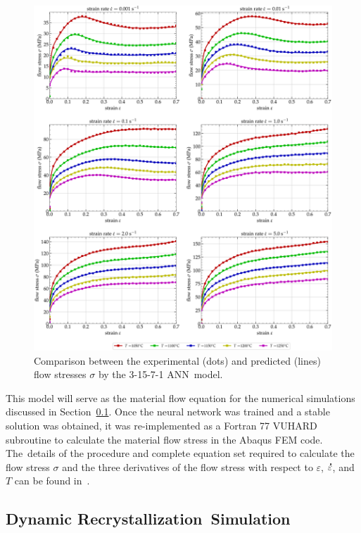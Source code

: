 \documentclass[metals,article,accept,pdftex,moreauthors]{Definitions/mdpi}
\DeclareRobustCommand{\mdot}[1]{\accentset{\mbox{\bfseries .}}{#1}}
\begin{document}
\begin{figure}[H]
\centering
\includegraphics[width=0.9\columnwidth]{Figures/CompExpANN-3-15-7-1}
\caption{Comparison %
 between the experimental (dots) and predicted (lines) flow stresses $\sigma$ by the 3-15-7-1 ANN~model.}
\label{fig:ANN-3-15-7-1}
\end{figure}
This model will serve as the material flow equation for the numerical simulations discussed in Section~\ref{subsec:DRXSimulation}.
Once the neural network was trained and a stable solution was obtained, it was re-implemented as a Fortran 77 VUHARD subroutine to calculate the material flow stress in the Abaqus FEM code. The~details of the procedure and complete equation set required to calculate the flow stress $\sigma$ and the three derivatives of the flow stress with respect to $\varepsilon$, $\mdot{\varepsilon}$, and $T$ can be found in~\cite{Pantale-2021}.

\subsection{Dynamic Recrystallization~Simulation}\label{subsec:DRXSimulation}
\end{document}
